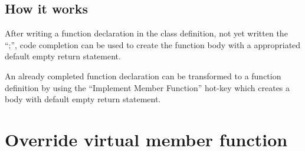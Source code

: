 \subsection{How it works}

After writing a function declaration in the class definition, not yet written
the ``;'', code completion can be used to create the function body with a
appropriated default empty return statement.\newline

An already completed function declaration can be transformed to a function
definition by using the ``Implement Member Function'' hot-key which creates a
body with default empty return statement.

\section{Override virtual member function}
